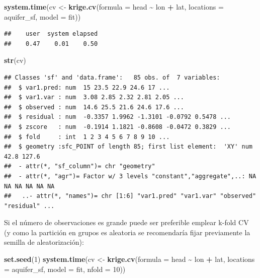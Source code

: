 \documentclass[
]{book}
\newenvironment{Shaded}{\begin{snugshade}}{\end{snugshade}}
\newcommand{\AttributeTok}[1]{\textcolor[rgb]{0.13,0.29,0.53}{#1}}
\newcommand{\DecValTok}[1]{\textcolor[rgb]{0.00,0.00,0.81}{#1}}
\newcommand{\FunctionTok}[1]{\textcolor[rgb]{0.13,0.29,0.53}{\textbf{#1}}}
\newcommand{\NormalTok}[1]{#1}
\newcommand{\OtherTok}[1]{\textcolor[rgb]{0.56,0.35,0.01}{#1}}
\newcommand{\SpecialCharTok}[1]{\textcolor[rgb]{0.81,0.36,0.00}{\textbf{#1}}}
\theoremstyle{break}
\theoremstyle{definition}
\theoremstyle{definition}
\theoremstyle{definition}
\theoremstyle{definition}
\theoremstyle{remark}
\begin{document}
\begin{Shaded}
\begin{Highlighting}[]
\FunctionTok{system.time}\NormalTok{(cv }\OtherTok{\textless{}{-}} \FunctionTok{krige.cv}\NormalTok{(}\AttributeTok{formula =}\NormalTok{ head }\SpecialCharTok{\textasciitilde{}}\NormalTok{ lon }\SpecialCharTok{+}\NormalTok{ lat, }\AttributeTok{locations =}\NormalTok{ aquifer\_sf,}
                           \AttributeTok{model =}\NormalTok{ fit))}
\end{Highlighting}
\end{Shaded}

\begin{verbatim}
##    user  system elapsed 
##    0.47    0.01    0.50
\end{verbatim}

\begin{Shaded}
\begin{Highlighting}[]
\FunctionTok{str}\NormalTok{(cv)}
\end{Highlighting}
\end{Shaded}

\begin{verbatim}
## Classes 'sf' and 'data.frame':   85 obs. of  7 variables:
##  $ var1.pred: num  15 23.5 22.9 24.6 17 ...
##  $ var1.var : num  3.08 2.85 2.32 2.81 2.05 ...
##  $ observed : num  14.6 25.5 21.6 24.6 17.6 ...
##  $ residual : num  -0.3357 1.9962 -1.3101 -0.0792 0.5478 ...
##  $ zscore   : num  -0.1914 1.1821 -0.8608 -0.0472 0.3829 ...
##  $ fold     : int  1 2 3 4 5 6 7 8 9 10 ...
##  $ geometry :sfc_POINT of length 85; first list element:  'XY' num  42.8 127.6
##  - attr(*, "sf_column")= chr "geometry"
##  - attr(*, "agr")= Factor w/ 3 levels "constant","aggregate",..: NA NA NA NA NA NA
##   ..- attr(*, "names")= chr [1:6] "var1.pred" "var1.var" "observed" "residual" ...
\end{verbatim}

Si el número de observaciones es grande puede ser preferible emplear k-fold CV (y como la partición en grupos es aleatoria se recomendaría fijar previamente la semilla de aleatorización):

\begin{Shaded}
\begin{Highlighting}[]
\FunctionTok{set.seed}\NormalTok{(}\DecValTok{1}\NormalTok{)}
\FunctionTok{system.time}\NormalTok{(cv }\OtherTok{\textless{}{-}} \FunctionTok{krige.cv}\NormalTok{(}\AttributeTok{formula =}\NormalTok{ head }\SpecialCharTok{\textasciitilde{}}\NormalTok{ lon }\SpecialCharTok{+}\NormalTok{ lat, }\AttributeTok{locations =}\NormalTok{ aquifer\_sf,}
                           \AttributeTok{model =}\NormalTok{ fit, }\AttributeTok{nfold =} \DecValTok{10}\NormalTok{))}
\end{Highlighting}
\end{Shaded}
\end{document}
